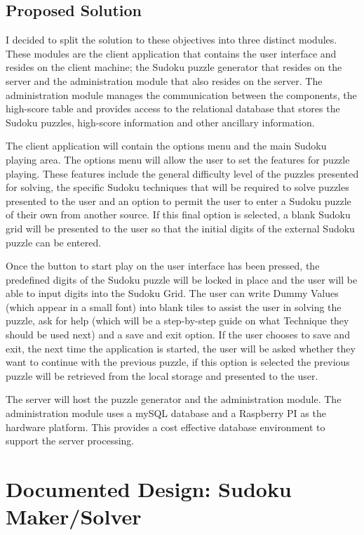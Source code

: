 \documentclass[fleqn]{article}
\begin{document}
\subsection{Proposed Solution}
I decided to split the solution to these objectives into three distinct modules. These modules are the client application that contains the user interface and resides on the client machine; the Sudoku puzzle generator that resides on the server and the administration module that also resides on the server. The administration module manages the communication between the components, the high-score table and provides access to the relational database that stores the Sudoku puzzles, high-score information and other ancillary information.

The client application will contain the options menu and the main Sudoku playing area. The options menu will allow the user to set the features for puzzle playing. These features include the general difficulty level of the puzzles presented for solving, the specific Sudoku techniques that will be required to solve puzzles presented to the user and an option to permit the user to enter a Sudoku puzzle of their own from another source. If this final option is selected, a blank Sudoku grid will be presented to the user so that the initial digits of the external Sudoku puzzle can be entered.

Once the button to start play on the user interface has been pressed, the predefined digits of the Sudoku puzzle will be locked in place and the user will be able to input digits into the Sudoku Grid. The user can write Dummy Values (which appear in a small font) into blank tiles to assist the user in solving the puzzle, ask for help (which will be a step-by-step guide on what Technique they should be used next) and a save and exit option. If the user chooses to save and exit, the next time the application is started, the user will be asked whether they want to continue with the previous puzzle, if this option is selected the previous puzzle will be retrieved from the local storage and presented to the user.

The server will host the puzzle generator and the administration module. The administration module uses a mySQL database and a Raspberry PI as the hardware platform. This provides a cost effective database environment to support the server processing.

\newpage
\section{Documented Design: Sudoku Maker/Solver}
\end{document}
